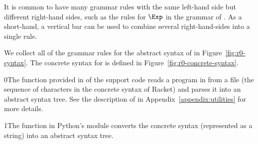 \documentclass[7x10,nocrop]{TimesAPriori_MIT}%
\def\racketEd{0}
\def\pythonEd{1}
\def\edition{0}
\newcommand{\racket}[1]{{\if\edition\racketEd{#1}\fi}}
\newcommand{\python}[1]{{\if\edition\pythonEd #1\fi}}
\begin{document}
It is common to have many grammar rules with the same left-hand side
but different right-hand sides, such as the rules for $\Exp$ in the
grammar of \LangInt{}. As a short-hand, a vertical bar can be used to
combine several right-hand-sides into a single rule.

We collect all of the grammar rules for the abstract syntax of \LangInt{}
in Figure~\ref{fig:r0-syntax}. The concrete syntax for \LangInt{} is
defined in Figure~\ref{fig:r0-concrete-syntax}.

\racket{The  function provided in
  \code{utilities.rkt} of the support code reads a program in from a
  file (the sequence of characters in the concrete syntax of Racket)
  and parses it into an abstract syntax tree. See the description of
  \code{read-program} in Appendix~\ref{appendix:utilities} for more
  details.}

\python{The  function in Python's  module
  converts the concrete syntax (represented as a string) into an
  abstract syntax tree.}

\newcommand{\LintGrammarRacket}{
  \begin{array}{rcl}
    \Type &::=& \key{Integer} \\
    \Exp{} &::=& \Int{} \MID \CREAD \RP \MID \CNEG{\Exp} \MID \CADD{\Exp}{\Exp}
      \MID \CSUB{\Exp}{\Exp}
  \end{array}
}
\newcommand{\LintASTRacket}{
  \begin{array}{rcl}
    \Type &::=& \key{Integer} \\
    \Exp{} &::=& \INT{\Int} \MID \READ{} \\
           &\MID& \NEG{\Exp} \MID \ADD{\Exp}{\Exp} \MID \SUB{\Exp}{\Exp}
  \end{array}
}
\newcommand{\LintGrammarPython}{
\begin{array}{rcl}
  \Exp &::=& \Int \MID \key{input\_int}\LP\RP \MID \key{-}\;\Exp \MID \Exp \; \key{+} \; \Exp \MID \Exp \; \key{-} \; \Exp \MID \LP\Exp\RP \\
  \Stmt &::=& \key{print}\LP \Exp \RP \MID \Exp
\end{array}
}
\newcommand{\LintASTPython}{
  \begin{array}{rcl}
  \itm{binaryop} &::= & \code{Add()} \MID \code{Sub()} \\
  \itm{unaryop} &::= & \code{USub()} \\
  \Exp{} &::=& \INT{\Int} \MID \READ{} \\
        &\MID& \UNIOP{\itm{unaryop}}{\Exp} \MID  \BINOP{\itm{binaryop}}{\Exp}{\Exp}  \\
  \Stmt{} &::=& \PRINT{\Exp} \MID \EXPR{\Exp} 
\end{array}
}
\end{document}
